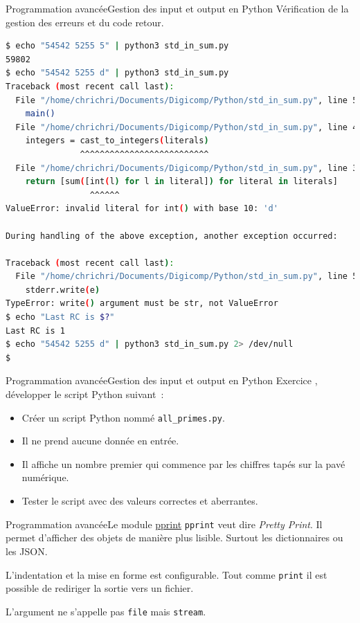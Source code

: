 \documentclass{beamer}
\begin{document}
    \begin{frame}[fragile]{Programmation avancée}{Gestion des input et output en Python}
        Vérification de la gestion des erreurs et du code retour.
        \begin{lstlisting}[language=Bash,basicstyle=\tiny\ttfamily]
$ echo "54542 5255 5" | python3 std_in_sum.py
59802
$ echo "54542 5255 d" | python3 std_in_sum.py
Traceback (most recent call last):
  File "/home/chrichri/Documents/Digicomp/Python/std_in_sum.py", line 53, in <module>
    main()
  File "/home/chrichri/Documents/Digicomp/Python/std_in_sum.py", line 46, in main
    integers = cast_to_integers(literals)
               ^^^^^^^^^^^^^^^^^^^^^^^^^^
  File "/home/chrichri/Documents/Digicomp/Python/std_in_sum.py", line 37, in cast_to_integers
    return [sum([int(l) for l in literal]) for literal in literals]
                 ^^^^^^
ValueError: invalid literal for int() with base 10: 'd'

During handling of the above exception, another exception occurred:

Traceback (most recent call last):
  File "/home/chrichri/Documents/Digicomp/Python/std_in_sum.py", line 56, in <module>
    stderr.write(e)
TypeError: write() argument must be str, not ValueError
$ echo "Last RC is $?"
Last RC is 1
$ echo "54542 5255 d" | python3 std_in_sum.py 2> /dev/null
$
        \end{lstlisting}
    \end{frame}

    \begin{frame}{Programmation avancée}{Gestion des input et output en Python}
        Exercice \execcounterdispinc{}, développer le script Python suivant~:
        \begin{itemize}
            \item Créer un script Python nommé \lstinline{all_primes.py}.
            \item Il ne prend aucune donnée en entrée.
            \item Il affiche un nombre premier qui commence par les chiffres tapés sur la pavé numérique.
            \item Tester le script avec des valeurs correctes et aberrantes.
        \end{itemize}
    \end{frame}

    \begin{frame}{Programmation avancée}{Le module \href{https://docs.python.org/fr/3/library/pprint.html}{pprint}}
        \lstinline{pprint} veut dire \textit{Pretty Print}.
        \bigbreak
        Il permet d'afficher des objets de manière plus lisible. Surtout les dictionnaires ou les JSON.

        L'indentation et la mise en forme est configurable.
        Tout comme \lstinline{print} il est possible de rediriger la sortie vers un fichier.
        \begin{dangercolorbox}
            L'argument ne s'appelle pas \lstinline{file} mais \lstinline{stream}.
        \end{dangercolorbox}
    \end{frame}
\end{document}
